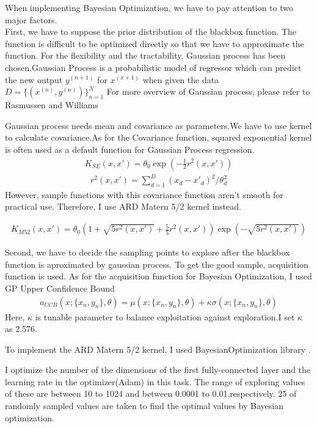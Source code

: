 When implementing Bayesian Optimization, we have to pay attention to two major factors.\\

First, we have to suppose the prior distribution of the blackbox function. The function is difficult to be optimized directly so that we have to approximate the function. For the flexibility and the tractability, Gaussian process has been chosen.Gaussian Process is a probabilistic model of regressor which  can predict the new output $y^{(n+1)}$ for $x^{(x+1)}$ when given the data $D=\{(x^{(n)},y^{(n)})\}^{N}_{n=1}$  
For more overview of Gaussian process, please refer to Rasmussen and Williams\cite{Gaussian}

Gaussian process needs mean and covariance as parameters.We have to use kernel to calculate covariance.As for the Covariance function, squared exponential kernel is often used as a default function for Gaussian Process regression.
\begin{eqnarray}
K_{SE}(x,x')=\theta_{0}\exp{(-\frac{1}{2}r^2(x,x'))} 
\end{eqnarray}
\begin{eqnarray}
r^2(x,x')=\sum^{D}_{d=1}(x_{d}-x'_{d})^2/\theta^2_{d}
\end{eqnarray}
However, sample functions with this covariance function aren't smooth for practical use. Therefore,  I use ARD Matern 5/2 kernel instead.

\begin{eqnarray}
K_{M52}(x,x')=\theta_{0}(1+\sqrt{5r^2(x,x')}+\frac{5}{3}r^2(x,x'))\exp{(-\sqrt{5r^2(x,x')})}
\end{eqnarray}


Second, we have to decide the sampling points to explore after the blackbox function is aproximated by gaussian process. To get the good sample, acquisition function is used. As for the acquisition function for Bayesian Optimization, I used GP Upper Confidence Bound
 \begin{eqnarray}
a_{UCB}(x;\{x_n,y_n\},\theta)=\mu(x;\{x_n,y_n\},\theta)+\kappa\sigma(x;\{x_n,y_n\},\theta)
\end{eqnarray}
Here, $\kappa$ is tunable parameter to balance exploitation against exploration.I set $\kappa$ as 2.576.


To implement the ARD Matern 5/2 kernel, I used BayesianOptimization library \cite{library}.

I optimize the number of the dimensions of the first fully-connected layer and the learning rate in the optimizer(Adam) in this task. The range of exploring values of these are between 10 to 1024 and between 0.0001 to 0.01,respectively. 25 of randomly sampled values are taken to find the optimal values by Bayesian optimization.


